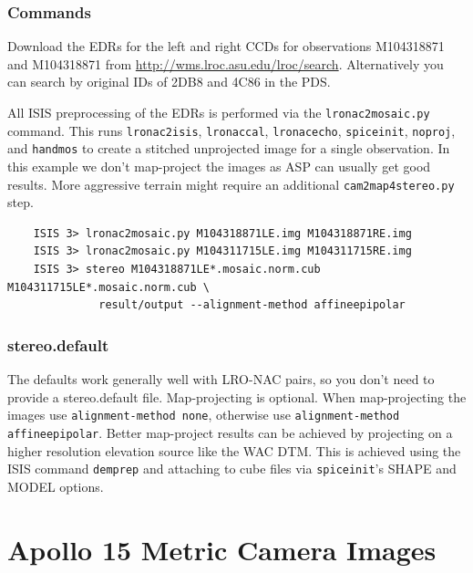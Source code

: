 \subsubsection*{Commands}

Download the EDRs for the left and right CCDs for observations
M104318871 and M104318871 from \url{http://wms.lroc.asu.edu/lroc/search}.
Alternatively you can search by original
IDs of 2DB8 and 4C86 in the PDS.

All ISIS preprocessing of the EDRs is performed via the
\texttt{lronac2mosaic.py} command. This runs \texttt{lronac2isis},
\texttt{lronaccal}, \texttt{lronacecho}, \texttt{spiceinit},
\texttt{noproj}, and \texttt{handmos} to create a stitched unprojected
image for a single observation. In this example we don't map-project
the images as ASP can usually get good results. More aggressive
terrain might require an additional \texttt{cam2map4stereo.py} step.

\begin{verbatim}
    ISIS 3> lronac2mosaic.py M104318871LE.img M104318871RE.img
    ISIS 3> lronac2mosaic.py M104311715LE.img M104311715RE.img
    ISIS 3> stereo M104318871LE*.mosaic.norm.cub M104311715LE*.mosaic.norm.cub \
              result/output --alignment-method affineepipolar
\end{verbatim}

\subsubsection*{stereo.default}

The defaults work generally well with LRO-NAC pairs, so you don't need
to provide a stereo.default file. Map-projecting is optional. When
map-projecting the images use \texttt{alignment-method none}, otherwise
use \texttt{alignment-method affineepipolar}. Better map-project results
can be achieved by projecting on a higher resolution elevation source
like the WAC DTM. This is achieved using the ISIS command \texttt{demprep}
and attaching to cube files via \texttt{spiceinit}'s SHAPE and MODEL
options.

\section{Apollo 15 Metric Camera Images}

\begin{tabular}{ r c r c}

\end{tabular}

